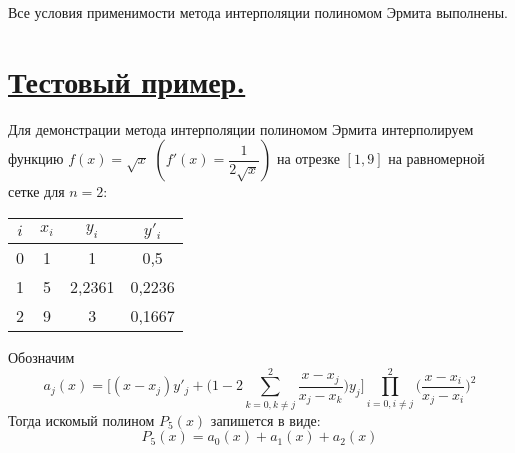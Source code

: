 \documentclass[a4paper, 12pt]{article}
\begin{document}
	Все условия применимости метода интерполяции полиномом Эрмита выполнены.
	
	\section{\underline{Тестовый пример.}}
	
	Для демонстрации метода интерполяции полиномом Эрмита интерполируем функцию $f(x)=\sqrt{x}$  $(f'(x)=\dfrac{1}{2\sqrt{x}})$ на отрезке $[1,9]$ на равномерной сетке для $n=2$:
	\begin{center}
		\begin{tabular}{ | c | c | c | c | }
			\hline
			$i$ & $x_i$ & $y_i$ & $y'_i$ \\ \hline
			0 & 1 & 1 & 0,5 \\ \hline
			1 & 5 & 2,2361 & 0,2236 \\ \hline
			2 & 9 & 3 & 0,1667 \\
			\hline
		\end{tabular}
	\end{center}
	Обозначим 
	\begin{equation}
		a_j(x)=\bigg[(x-x_j)y'_j+\bigg(1-2\sum\limits_{k=0,k\neq j}^2\frac{x-x_j}{x_j-x_k}\bigg)y_j\bigg]\prod\limits_{i=0,i\neq j}^2\bigg(\frac{x-x_i}{x_j-x_i}\bigg)^2
	\end{equation}
	Тогда искомый полином $P_5(x)$ запишется в виде:
	\begin{equation}
		P_5(x)=a_0(x)+a_1(x)+a_2(x)
	\end{equation}
\end{document}
